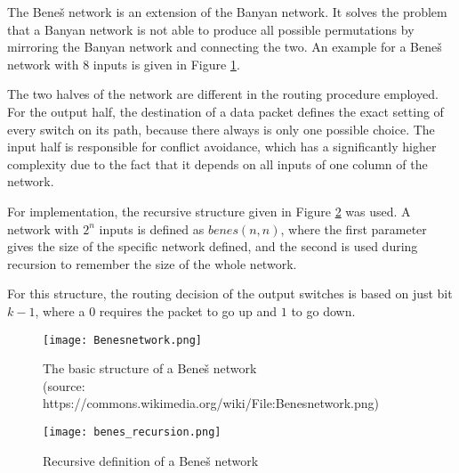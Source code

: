 The Beneš network is an extension of the Banyan network.
It solves the problem that a Banyan network is not able to produce all possible permutations by mirroring the Banyan network and connecting the two.
An example for a Beneš network with 8 inputs is given in Figure \ref{fig:benes}.

The two halves of the network are different in the routing procedure employed.
For the output half, the destination of a data packet defines the exact setting of every switch on its path, because there always is only one possible choice.
The input half is responsible for conflict avoidance, which has a significantly higher complexity due to the fact that it depends on all inputs of one column of the network.

For implementation, the recursive structure given in Figure \ref{fig:benes_recursion} was used.
A network with $2^n$ inputs is defined as $benes(n, n)$, where the first parameter gives the size of the specific network defined, and the second is used during recursion to remember the size of the whole network.

For this structure, the routing decision of the output switches is based on just bit $k - 1$, where a $0$ requires the packet to go up and $1$ to go down.

\begin{figure}[!ht]
	\centering
	\texttt{[image: Benesnetwork.png]}
	\caption{
		The basic structure of a Beneš network \protect \\ 
		(source: https://commons.wikimedia.org/wiki/File:Benesnetwork.png)
	}
	\label{fig:benes}
\end{figure}


\begin{figure}[!ht]
	\centering
	\texttt{[image: benes\_recursion.png]}
	\caption{Recursive definition of a Beneš network}
	\label{fig:benes_recursion}
\end{figure}

